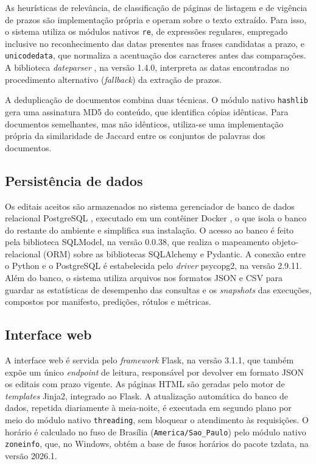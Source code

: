 As heurísticas de relevância, de classificação de páginas de listagem e de
vigência de prazos são implementação própria e operam sobre o texto extraído.
Para isso, o sistema utiliza os módulos nativos \texttt{re}, de expressões
regulares, empregado inclusive no reconhecimento das datas presentes nas frases
candidatas a prazo, e \texttt{unicodedata}, que normaliza a acentuação dos
caracteres antes das comparações. A biblioteca \textit{dateparser} \cite{dateparser}, na
versão 1.4.0, interpreta as datas encontradas no procedimento alternativo
(\textit{fallback}) da extração de prazos.

A deduplicação de documentos combina duas técnicas. O módulo nativo
\texttt{hashlib} gera uma assinatura MD5 \cite{rivest1992} do conteúdo,
que identifica cópias idênticas. Para documentos semelhantes, mas não
idênticos, utiliza-se uma implementação própria da similaridade de Jaccard
\cite{jaccard1901,broder1997} entre os conjuntos de palavras dos documentos.

\subsection{Persistência de dados}

Os editais aceitos são armazenados no sistema gerenciador de banco de dados
relacional PostgreSQL \cite{postgresql}, executado em um contêiner Docker
\cite{docker}, o que isola o banco do restante do ambiente e simplifica sua
instalação. O acesso ao banco é feito pela biblioteca SQLModel, na versão
0.0.38, que realiza o mapeamento objeto-relacional (ORM) sobre as bibliotecas
SQLAlchemy e Pydantic. A conexão entre o Python e o PostgreSQL é estabelecida
pelo \textit{driver} psycopg2, na versão 2.9.11. Além do banco, o sistema
utiliza arquivos nos formatos JSON e CSV para guardar as estatísticas de
desempenho das consultas e os \textit{snapshots} das execuções, compostos por
manifesto, predições, rótulos e métricas.

\subsection{Interface web}

A interface web é servida pelo \textit{framework} Flask, na versão 3.1.1, que
também expõe um único \textit{endpoint} de leitura, responsável por devolver em
formato JSON os editais com prazo vigente. As páginas HTML são geradas pelo
motor de \textit{templates} Jinja2, integrado ao Flask. A atualização automática
do banco de dados, repetida diariamente à meia-noite, é executada em segundo
plano por meio do módulo nativo \texttt{threading}, sem bloquear o atendimento
às requisições. O horário é calculado no fuso de Brasília
(\texttt{America/Sao\_Paulo}) pelo módulo nativo \texttt{zoneinfo}, que, no
Windows, obtém a base de fusos horários do pacote tzdata, na versão 2026.1.

